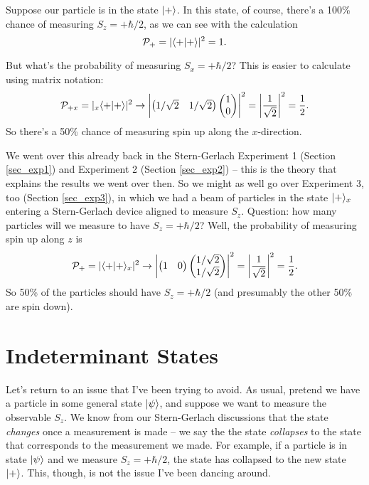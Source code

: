 \begin{example}
Suppose our particle is in the state $| + \rangle$.  In this state, of course, there's a 100\% chance of measuring $S_z = +\hbar/2$, as we can see with the calculation
\[
\mathcal{P}_+ = |\langle + | + \rangle|^2 = 1.
\]

But what's the probability of measuring $S_x = +\hbar/2$?  This is easier to calculate using matrix notation:
\[
\mathcal{P}_{+x} = | _x \langle + | + \rangle|^2 \to 
\left| 
\begin{pmatrix} 1/\sqrt{2} & 1/\sqrt{2} \end{pmatrix}
\begin{pmatrix} 1 \\ 0 \end{pmatrix}
\right|^2 = \left| \frac{1}{\sqrt{2}} \right|^2 = \frac{1}{2}.
\]
So there's a 50\% chance of measuring spin up along the $x$-direction.

We went over this already back in the Stern-Gerlach Experiment 1 (Section \ref{sec_exp1}) and Experiment 2 (Section \ref{sec_exp2}) -- this is the theory that explains the results we went over then.  So we might as well go over Experiment 3, too (Section \ref{sec_exp3}), in which we had a beam of particles in the state $| + \rangle_x$ entering a Stern-Gerlach device aligned to measure $S_z$.  Question:  how many particles will we measure to have $S_z = +\hbar/2$?  Well, the probability of measuring spin up along $z$ is
\[
\mathcal{P}_{+} = |  \langle + | + \rangle_x|^2 \to 
\left| 
\begin{pmatrix} 1 & 0 \end{pmatrix}
\begin{pmatrix} 1/\sqrt{2} \\ 1/\sqrt{2} \end{pmatrix}
\right|^2 = \left| \frac{1}{\sqrt{2}} \right|^2 = \frac{1}{2}.
\]
So 50\% of the particles should have $S_z = +\hbar/2$ (and presumably the other 50\% are spin down).

\end{example}


\section{Indeterminant States}

Let's return to an issue that I've been trying to avoid.  As usual, pretend we have a particle in some general state $| \psi \rangle$, and suppose we want to measure the observable $S_z$.  We know from our Stern-Gerlach discussions that the state \emph{changes} once a measurement is made -- we say the the state \emph{collapses} to the state that corresponds to the measurement we made.  For example, if a particle is in state $| \psi \rangle$ and we measure $S_z = +\hbar/2$, the state has collapsed to the new state $| + \rangle$.  This, though, is not the issue I've been dancing around.

